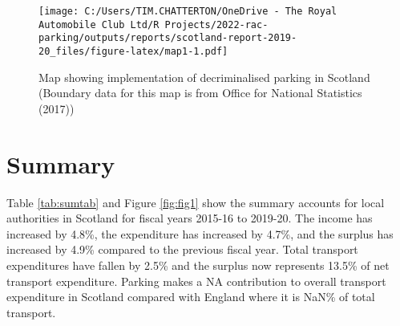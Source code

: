 \documentclass[
  12pt,
]{article}
\begin{document}
\begin{figure}
\centering
\texttt{[image: C:/Users/TIM.CHATTERTON/OneDrive - The Royal Automobile Club Ltd/R Projects/2022-rac-parking/outputs/reports/scotland-report-2019-20\_files/figure-latex/map1-1.pdf]}
\caption{\label{fig:map1}Map showing implementation of decriminalised parking in Scotland (Boundary data for this map is from Office for National Statistics (2017))}
\end{figure}

\hypertarget{summary}{%
\section{Summary}\label{summary}}

Table \ref{tab:sumtab} and Figure \ref{fig:fig1} show the summary accounts for local authorities in Scotland for fiscal years 2015-16 to 2019-20. The income has
increased by 4.8\%, the expenditure has
increased by 4.7\%, and the surplus has
increased by 4.9\%
compared to the previous fiscal year. Total transport expenditures have
fallen by 2.5\% and the surplus now represents 13.5\% of net transport expenditure. Parking makes a
NA contribution to overall transport expenditure in Scotland compared with England where it is NaN\% of total transport.

\newpage

\begingroup\fontsize{10}{12}\selectfont
\end{document}
